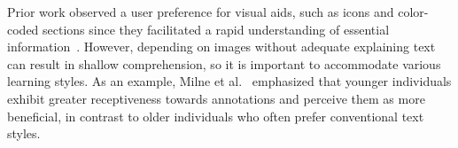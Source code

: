 Prior work observed a user preference for visual aids, such as icons and color-coded sections since they facilitated a rapid understanding of essential information~\cite{balebako2022nudging}.
However, depending on images without adequate explaining text can result in shallow comprehension, so it is important to accommodate various learning styles.
As an example, Milne et al.~\cite{milne2004consumers} emphasized that younger individuals exhibit greater receptiveness towards annotations and perceive them as more beneficial, in contrast to older individuals who often prefer conventional text styles.


